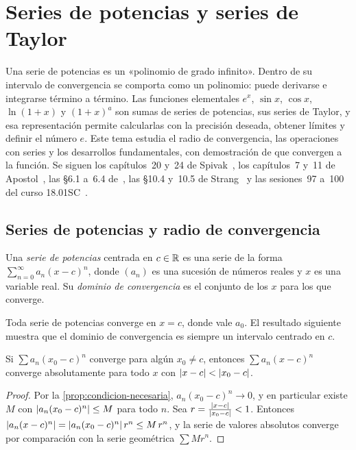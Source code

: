 \chapter{Series de potencias y series de Taylor}
\label{tema:6}

Una serie de potencias es un «polinomio de grado infinito». Dentro de su intervalo de convergencia se comporta como un polinomio: puede derivarse e integrarse término a término. Las funciones elementales $e^{x}$, $\sin x$, $\cos x$, $\ln(1+x)$ y $(1+x)^{a}$ son sumas de series de potencias, sus series de Taylor, y esa representación permite calcularlas con la precisión deseada, obtener límites y definir el número $e$. Este tema estudia el radio de convergencia, las operaciones con series y los desarrollos fundamentales, con demostración de que convergen a la función. Se siguen los capítulos~20 y~24 de Spivak~\cite{spivak}, los capítulos~7 y~11 de Apostol~\cite{apostol}, las §6.1 a~6.4 de~\cite{openstax2}, las §10.4 y~10.5 de Strang~\cite{strang} y las sesiones~97 a~100 del curso 18.01SC~\cite{mit1801}.

\section{Series de potencias y radio de convergencia}

\begin{definicion}\label{def:serie-potencias}
Una \emph{serie de potencias} centrada en $c\in\mathbb{R}$ es una serie de la forma $\sum_{n=0}^{\infty}a_n(x-c)^{n}$, donde $(a_n)$ es una sucesión de números reales y $x$ es una variable real. Su \emph{dominio de convergencia} es el conjunto de los $x$ para los que converge.
\end{definicion}

Toda serie de potencias converge en $x=c$, donde vale $a_0$. El resultado siguiente muestra que el dominio de convergencia es siempre un intervalo centrado en $c$.

\begin{lema}\label{lem:abel}
Si $\sum a_n(x_0-c)^{n}$ converge para algún $x_0\neq c$, entonces $\sum a_n(x-c)^{n}$ converge absolutamente para todo $x$ con $\lvert x-c\rvert<\lvert x_0-c\rvert$.
\end{lema}

\begin{proof}
Por la \cref{prop:condicion-necesaria}, $a_n(x_0-c)^{n}\to0$, y en particular existe $M$ con $\lvert a_n(x_0-c)^{n}\rvert\le M$ para todo $n$. Sea $r=\frac{\lvert x-c\rvert}{\lvert x_0-c\rvert}<1$. Entonces $\lvert a_n(x-c)^{n}\rvert=\lvert a_n(x_0-c)^{n}\rvert\,r^{n}\le M\,r^{n}$, y la serie de valores absolutos converge por comparación con la serie geométrica $\sum Mr^{n}$.
\end{proof}

